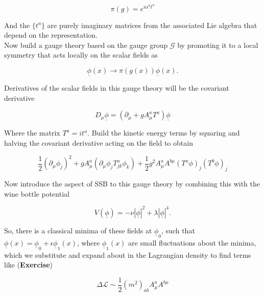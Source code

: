  \begin{equation}
 \pi (g) = e^{i \alpha^a t^a}
 \end{equation}
 
 \noindent And the $\{t^a\}$ are purely imaginary matrices from the associated Lie algebra that depend on the representation. \\
 
 \noindent Now build a gauge theory based on the gauge group $\mathcal{G}$ by promoting it to a local symmetry that acts locally on the scalar fields as
 
 \begin{equation}
 \underline{\phi} (x) \rightarrow \pi (g(x)) \underline{\phi} (x).
 \end{equation}
 
 \noindent Derivatives of the scalar fields in this gauge theory will be the covariant derivative
 
 \begin{equation}
 D_\mu \underline{\phi} = (\partial_\mu + g A_\mu^a T^a ) \underline{\phi}
 \end{equation}
 
 \noindent Where the matrix $T^a = i t^a$. Build the kinetic energy terms by squaring and halving the covariant derivative acting on the field to obtain
 
 \begin{equation}
 \frac{1}{2} (\partial_\mu \phi_j )^2 + g A_\mu^a ( \partial_\mu \phi_j T_{jk}^a \phi_k ) + \frac{1}{2} g^2 A_\mu^a A^{b \mu} (T^a \phi)_j (T^b \phi)_j
 \end{equation}

\noindent Now introduce the aspect of SSB to this gauge theory by combining this with the wine bottle potential

\begin{equation}
V(\underline{\phi}) = -\nu | \underline{\phi} |^2 + \lambda | \underline{\phi} |^4.
\end{equation}

\noindent So, there is a classical minima of these fields at $\underline{\phi}_0$, such that $\underline{\phi} (x) = \underline{\phi}_0 + \epsilon \underline{\phi}_1 (x)$, where $\underline{\phi}_1 (x)$ are small fluctuations about the minima, which we substitute and expand about in the Lagrangian density to find terms like (\textbf{Exercise})

\begin{equation}
\Delta \mathcal{L} \sim \frac{1}{2} (m^2)_{ab} A_\mu^a A^{b \mu}
\end{equation}

